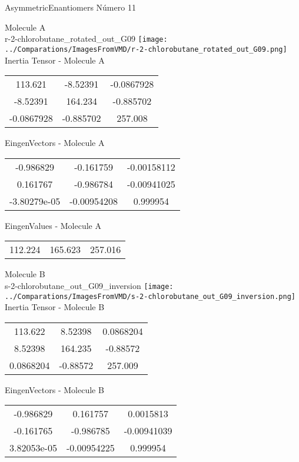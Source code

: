 \vtab[-2cm]
\begin{center}
{\large AsymmetricEnantiomers \tab Número 11}
\end{center}
\begin{multicols}{2}
\begin{center}

Molecule A \\ 
r-2-chlorobutane\_rotated\_out\_G09
\texttt{[image: ../Comparations/ImagesFromVMD/r-2-chlorobutane\_rotated\_out\_G09.png]}
\\
Inertia Tensor - Molecule A \\
\vtab

\begin{tabular}{|c c c|}
113.621	 & 	-8.52391	 & 	-0.0867928	 \\
-8.52391	 & 	164.234	 & 	-0.885702	 \\
-0.0867928	 & 	-0.885702	 & 	257.008
\end{tabular}

\vtab
 EingenVectors - Molecule A     \\
\vtab
\begin{tabular}{|c c c|}
-0.986829	 & 	-0.161759	 & 	-0.00158112	 \\
0.161767	 & 	-0.986784	 & 	-0.00941025	 \\
-3.80279e-05	 & 	-0.00954208	 & 	0.999954
\end{tabular}

\vtab
 EingenValues - Molecule A     \\
\vtab
\begin{tabular}{|c c c|}
112.224	 & 	165.623	 & 	257.016	 \\
\end{tabular}
\columnbreak

Molecule B \\ 
s-2-chlorobutane\_out\_G09\_inversion
\texttt{[image: ../Comparations/ImagesFromVMD/s-2-chlorobutane\_out\_G09\_inversion.png]}
\\
Inertia Tensor - Molecule B \\
\vtab

\begin{tabular}{|c c c|}
113.622	 & 	8.52398	 & 	0.0868204	 \\
8.52398	 & 	164.235	 & 	-0.88572	 \\
0.0868204	 & 	-0.88572	 & 	257.009
\end{tabular}

\vtab
 EingenVectors - Molecule B     \\
\vtab
\begin{tabular}{|c c c|}
-0.986829	 & 	0.161757	 & 	0.0015813	 \\
-0.161765	 & 	-0.986785	 & 	-0.00941039	 \\
3.82053e-05	 & 	-0.00954225	 & 	0.999954
\end{tabular}


\end{center}
\end{multicols}
